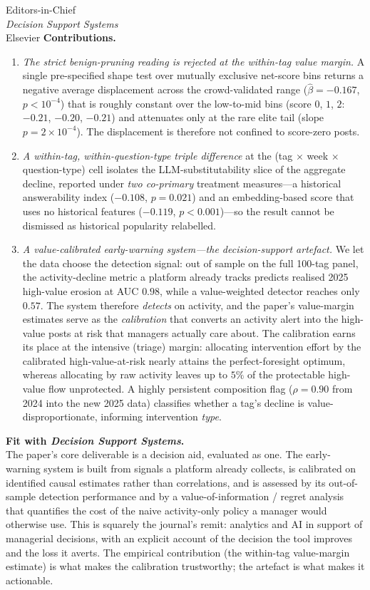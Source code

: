 \documentclass[12pt]{letter}
\begin{document}
\begin{letter}{Editors-in-Chief \\ \emph{Decision Support Systems} \\ Elsevier}
\noindent\textbf{Contributions.}\\
\begin{enumerate}
\item \emph{The strict benign-pruning reading is rejected at
the within-tag value margin.} A single pre-specified shape
test over mutually exclusive net-score bins returns a
negative average displacement across the crowd-validated
range ($\hat\beta = -0.167$, $p<10^{-4}$) that is roughly
constant over the low-to-mid bins (score $0$, $1$, $2$:
$-0.21$, $-0.20$, $-0.21$) and attenuates only at the rare
elite tail (slope $p = 2\times10^{-4}$). The displacement is
therefore not confined to score-zero posts.
\item \emph{A within-tag, within-question-type triple
difference} at the (tag $\times$ week $\times$ question-type)
cell isolates the LLM-substitutability slice of the
aggregate decline, reported under \emph{two co-primary}
treatment measures---a historical answerability index
($-0.108$, $p=0.021$) and an embedding-based score that uses
no historical features ($-0.119$, $p<0.001$)---so the result
cannot be dismissed as historical popularity relabelled.
\item \emph{A value-calibrated early-warning system---the
decision-support artefact.} We let the data choose the
detection signal: out of sample on the full 100-tag panel,
the activity-decline metric a platform already tracks
predicts realised 2025 high-value erosion at AUC $0.98$,
while a value-weighted detector reaches only $0.57$. The
system therefore \emph{detects} on activity, and the paper's
value-margin estimates serve as the \emph{calibration} that
converts an activity alert into the high-value posts at risk
that managers actually care about. The calibration earns its
place at the intensive (triage) margin: allocating
intervention effort by the calibrated high-value-at-risk
nearly attains the perfect-foresight optimum, whereas
allocating by raw activity leaves up to $5\%$ of the
protectable high-value flow unprotected. A highly persistent
composition flag ($\rho = 0.90$ from 2024 into the new 2025
data) classifies whether a tag's decline is
value-disproportionate, informing intervention \emph{type}.
\end{enumerate}

\noindent\textbf{Fit with \emph{Decision Support Systems}.}\\
The paper's core deliverable is a decision aid, evaluated as
one. The early-warning system is built from signals a
platform already collects, is calibrated on identified
causal estimates rather than correlations, and is assessed by
its out-of-sample detection performance and by a
value-of-information / regret analysis that quantifies the
cost of the naive activity-only policy a manager would
otherwise use. This is squarely the journal's remit:
analytics and AI in support of managerial decisions, with an
explicit account of the decision the tool improves and the
loss it averts. The empirical contribution (the within-tag
value-margin estimate) is what makes the calibration
trustworthy; the artefact is what makes it actionable.


\end{letter}
\end{document}
